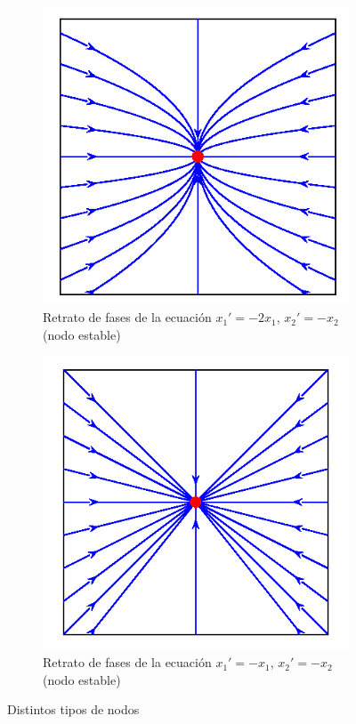 \begin{figure}[h]
\begin{subfigure}{.5\textwidth}
\begin{center}
\includegraphics[scale=.5]{imagenes/nodo_est_curv2.png}
\end{center}
\caption{Retrato de fases de la ecuación $x_1'=-2x_1$,
$x_2'=-x_2$ (nodo estable)}\label{fig:nodo_est_curv2}
\end{subfigure}
%
\begin{subfigure}{.5\textwidth}
\begin{center}
\includegraphics[scale=.5]{imagenes/nodo_est_alpha1.png}
\end{center}
\caption{Retrato de fases de la ecuación $x_1'=-x_1$,
$x_2'=-x_2$ (nodo estable)}\label{fig:nodo_est_alpha1}
\end{subfigure}
\caption{Distintos tipos de nodos}\label{fig:nodos}
\end{figure}


